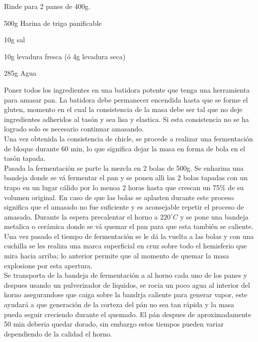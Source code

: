 
Rinde para 2 panes de 400g.

\begin{ingredientes}
\item 500g Harina de trigo panificable
\item 10g sal
\item 10g levadura fresca (ó 4g levadura seca)
\item 285g Agua
\end{ingredientes}
\preparacion
Poner todos los ingredientes en una batidora potente que tenga una herramienta para amasar pan. La batidora debe permanecer encendida hasta que se forme el gluten, momento en el cual la consistencia de la masa debe ser tal que no deje ingredientes adheridos al tasón y sea lisa y elastica. Si esta consistencia no se ha logrado solo es necesario continuar amasando.\\

Una vez obtenida la consistencia de chicle, se procede a realizar una fermentación de bloque durante 60 min, lo que significa dejar la masa en forma de bola en el tasón tapada.\\

Pasada la fermentación se parte la mezcla en 2 bolas de 500g. Se enharina una bandeja donde se vá fermentar el pan y se ponen alli las 2 bolas tapadas con un trapo en un lugar cálido por lo menoa 2 horas hasta que crescan un 75\% de su volumen original. En caso de que las bolas se aplasten durante este proceso significa que el amasado no fue suficiente y es aconsejable repetir el proceso de amasado. Durante la espera precalentar el horno a $220^{\circ}C$ y se pone una bandeja metalica o cerámica donde se vá quemar el pan para que esta también se caliente.\\


Una vez pasado el tiempo de fermentación se le dá la vuelta a las bolas y con una cuchilla se les realiza una marca superficial en cruz sobre todo el hemisferio que mira hacia arriba; lo anterior permite que al momento de quemar la masa explosione por esta apertura.\\

Se transporta de la bandeja de fermentación a al horno cada uno de los  panes y despues usando un pulverizador de liquidos, se rocia un poco agua al interior del horno asegurandose que caiga sobre la bandrja caliente para generar vapor, este ayudará a que generación de la corteza del pán no sea tan rápida y la masa pueda seguir creciendo durante el quemado. El pán despues de aproximadamente 50 min deberia quedar dorado, sin embargo estos tiempos pueden variar dependiendo de la calidad el horno.\\

